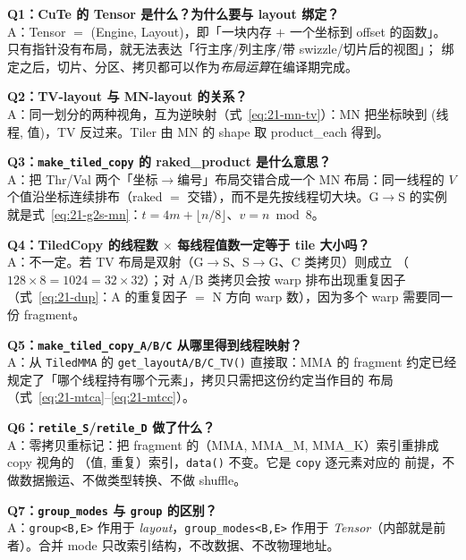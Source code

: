 \textbf{Q1：CuTe 的 Tensor 是什么？为什么要与 layout 绑定？}\\
A：Tensor $=$ (Engine, Layout)，即「一块内存 $+$ 一个坐标到 offset 的函数」。
只有指针没有布局，就无法表达「行主序/列主序/带 swizzle/切片后的视图」；
绑定之后，切片、分区、拷贝都可以作为\emph{布局运算}在编译期完成。

\textbf{Q2：TV-layout 与 MN-layout 的关系？}\\
A：同一划分的两种视角，互为逆映射（式~\eqref{eq:21-mn-tv}）：MN 把坐标映到
(线程, 值)，TV 反过来。Tiler 由 MN 的 shape 取 product\_each 得到。

\textbf{Q3：\texttt{make\_\allowbreak{}tiled\_\allowbreak{}copy} 的 raked\_product 是什么意思？}\\
A：把 Thr/Val 两个「坐标$\to$编号」布局交错合成一个 MN 布局：同一线程的 $V$
个值沿坐标连续排布（raked $=$ 交错），而不是先按线程切大块。G$\to$S 的实例
就是式~\eqref{eq:21-g2s-mn}：$t=4m+\lfloor n/8\rfloor$、$v=n\bmod 8$。

\textbf{Q4：TiledCopy 的线程数 $\times$ 每线程值数一定等于 tile 大小吗？}\\
A：不一定。若 TV 布局是双射（G$\to$S、S$\to$G、C 类拷贝）则成立
（$128\times8=1024=32\times32$）；对 A/B 类拷贝会按 warp 排布出现重复因子
（式~\eqref{eq:21-dup}：A 的重复因子 $=$ N 方向 warp 数），因为多个 warp
需要同一份 fragment。

\textbf{Q5：\texttt{make\_\allowbreak{}tiled\_\allowbreak{}copy\_\allowbreak{}A/\allowbreak{}B/\allowbreak{}C} 从哪里得到线程映射？}\\
A：从 \texttt{TiledMMA} 的 \texttt{get\_\allowbreak{}layout\allowbreak{}A/\allowbreak{}B/\allowbreak{}C\_\allowbreak{}TV\allowbreak{}()} 直接取：MMA 的
fragment 约定已经规定了「哪个线程持有哪个元素」，拷贝只需把这份约定当作目的
布局（式~\eqref{eq:21-mtca}--\eqref{eq:21-mtcc}）。

\textbf{Q6：\texttt{retile\_S}/\texttt{retile\_D} 做了什么？}\\
A：零拷贝重标记：把 fragment 的（MMA, MMA\_M, MMA\_K）索引重排成 copy 视角的
（值, 重复）索引，\texttt{data()} 不变。它是 \texttt{copy} 逐元素对应的
前提，不做数据搬运、不做类型转换、不做 shuffle。

\textbf{Q7：\texttt{group\_modes} 与 \texttt{group} 的区别？}\\
A：\texttt{group<B,E>} 作用于 \emph{layout}，\texttt{group\_\allowbreak{}modes\allowbreak{}<B,\allowbreak{}E>} 作用于
\emph{Tensor}（内部就是前者）。合并 mode 只改索引结构，不改数据、不改物理地址。

